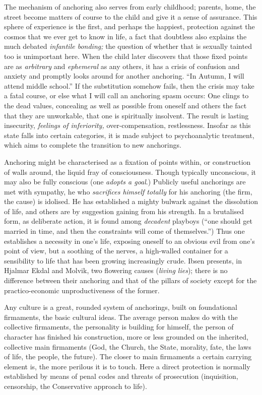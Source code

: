 \documentclass[draft,a4paper,10pt,twocolumn]{article}
\begin{document}
The mechanism of anchoring also serves from early childhood; parents, home, the
street become matters of course to the child and give it a sense of assurance.
This sphere of experience is the first, and perhaps the happiest, protection
against the cosmos that we ever get to know in life, a fact that doubtless also
explains the much debated \emph{infantile bonding;} the question of whether that
is sexually tainted too is unimportant here. When the child later discovers that
those fixed points are as \emph{arbitrary} and \emph{ephemeral} as any others,
it has a crisis of confusion and anxiety and promptly looks around for another
anchoring. \enquote{In Autumn, I will attend middle school.} If the substitution somehow fails, then the crisis may take a fatal course, or else what I will call an anchoring spasm occurs: One clings to the dead values, concealing as well as possible from oneself and others the fact that they are unworkable, that one is spiritually insolvent. The result is lasting insecurity, \emph{feelings of inferiority,} over-compensation, restlessness. Insofar as this state falls into certain categories, it is made subject to psychoanalytic treatment, which aims to complete the transition to new anchorings.

Anchoring might be characterised as a fixation of points within, or construction
of walls around, the liquid fray of consciousness. Though typically unconscious,
it may also be fully conscious (one \emph{adopts a goal}.) Publicly useful
anchorings are met with sympathy, he who \emph{sacrifices himself totally} for
his anchoring (the firm, the cause) is idolised. He has established a mighty
bulwark against the dissolution of life, and others are by suggestion gaining
from his strength. In a brutalised form, as deliberate action, it is found among
\emph{decadent} playboys (\enquote{one should get married in time, and then the
constraints will come of themselves.}) Thus one establishes a necessity in one's life, exposing oneself to an obvious evil from one's point of view, but a soothing of the nerves, a high-walled container for a sensibility to life that has been growing increasingly crude. Ibsen presents, in Hjalmar Ekdal and Molvik, two flowering causes (\emph{living lies}); there is no difference between their anchoring and that of the pillars of society except for the practico-economic unproductiveness of the former.

Any culture is a great, rounded system of anchorings, built on foundational firmaments, the basic cultural ideas. The average person makes do with the collective firmaments, the personality is building for himself, the person of character has finished his construction, more or less grounded on the inherited, collective main firmaments (God, the Church, the State, morality, fate, the laws of life, the people, the future). The closer to main firmaments a certain carrying element is, the more perilous it is to touch. Here a direct protection is normally established by means of penal codes and threats of prosecution (inquisition, censorship, the Conservative approach to life).
\end{document}
